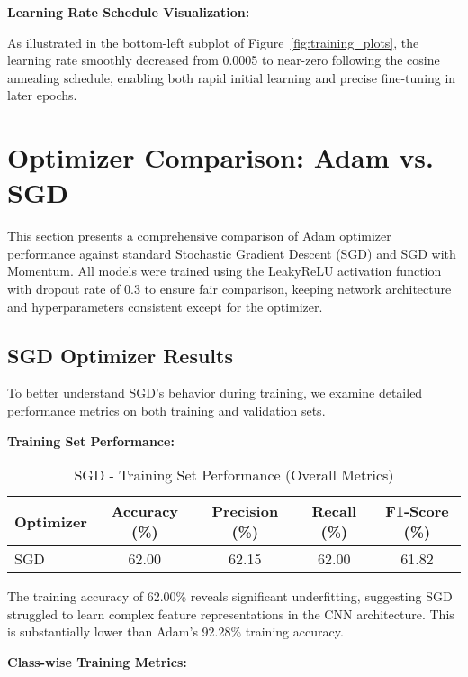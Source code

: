 \documentclass[12pt,a4paper]{article}
\begin{document}
\textbf{Learning Rate Schedule Visualization:}

As illustrated in the bottom-left subplot of Figure~\ref{fig:training_plots}, the learning rate smoothly decreased from 0.0005 to near-zero following the cosine annealing schedule, enabling both rapid initial learning and precise fine-tuning in later epochs.

\section{Optimizer Comparison: Adam vs. SGD}

This section presents a comprehensive comparison of Adam optimizer performance against standard Stochastic Gradient Descent (SGD) and SGD with Momentum. All models were trained using the LeakyReLU activation function with dropout rate of 0.3 to ensure fair comparison, keeping network architecture and hyperparameters consistent except for the optimizer.


\subsection{SGD Optimizer Results}

To better understand SGD's behavior during training, we examine detailed performance metrics on both training and validation sets.

\textbf{Training Set Performance:}

\begin{table}[H]
\centering
\caption{SGD - Training Set Performance (Overall Metrics)}
\begin{tabular}{lcccc}
\toprule
\textbf{Optimizer} & \textbf{Accuracy (\%)} & \textbf{Precision (\%)} & \textbf{Recall (\%)} & \textbf{F1-Score (\%)} \\
\midrule
SGD & 62.00 & 62.15 & 62.00 & 61.82 \\
\bottomrule
\end{tabular}
\end{table}

The training accuracy of 62.00\% reveals significant underfitting, suggesting SGD struggled to learn complex feature representations in the CNN architecture. This is substantially lower than Adam's 92.28\% training accuracy.

\textbf{Class-wise Training Metrics:}
\end{document}
